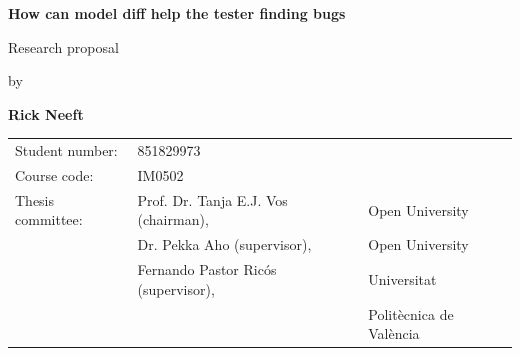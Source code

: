 \documentclass{ou-report-vaf}
\begin{document}

\pagestyle{plain}
\begin{titlepage}
\begin{center}


\vspace*{2\bigskipamount}

{\color{red}\Huge\bf How can model diff help the tester finding bugs}
\bigskip

{\large Research proposal}

\bigskip \bigskip
by
\bigskip \bigskip

{\Large\bf Rick Neeft}

\bigskip \bigskip\bigskip \bigskip

\begin{tabular}{lll}
    Student number: & 851829973 \\
    Course code: & \textsc{IM}0502\\
    Thesis committee:
        & Prof. Dr. Tanja E.J. Vos (chairman), & Open University \\
        & Dr. Pekka Aho (supervisor), & Open University \\
        & Fernando Pastor Ricós (supervisor), & Universitat \\
        &  & Politècnica de València
\end{tabular}

\end{center}
\end{titlepage}

\let\cleardoublepage\clearpage
\end{document}
